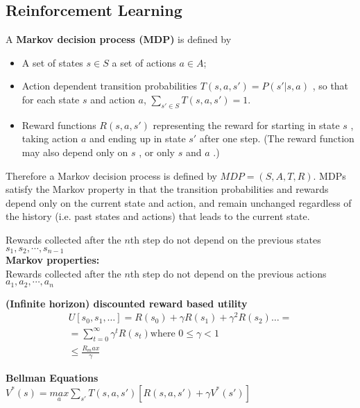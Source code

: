\subsection{Reinforcement Learning}

A \textbf{Markov decision process (MDP)} is defined by
\begin{itemize}
    \item A set of states  $s\in S$ a set of actions $a \in A$;
    
    \item Action dependent transition probabilities $T(s,a,s')=P(s'|s, a)$ , so that for each state  $s$ and action $a$,  $\displaystyle \sum _{s'\in S} T(s,a,s')=1$.
    
    \item Reward functions $R(s, a, s')$ representing the reward for starting in state  $s$ , taking action  $a$  and ending up in state  $s'$  after one step. (The reward function may also depend only on  $s$ , or only  $s$  and  $a$ .)
\end{itemize}
    
Therefore a Markov decision process is defined by $MDP = (S,A,T,R)$. MDPs satisfy the Markov property in that the transition probabilities and rewards depend only on the current state and action, and remain unchanged regardless of the history (i.e. past states and actions) that leads to the current state.

Rewards collected after the  $n$th  step do not depend on the previous states $s_1,s_2,\cdots,s_{n-1}$\\

\textbf{Markov properties:}\\

Rewards collected after the $n$th  step do not depend on the previous actions $a_1,a_2,\cdots,a_{n}$

\textbf{(Infinite horizon) discounted reward based utility}\\

\begin{align*}
U[s_0,s_1,\ldots ]= R(s_0) + \gamma R(s_1) + \gamma ^2 R(s_2) \ldots = \\
= \sum _{t=0}^\infty \gamma ^ t R(s_ t) \text {where }0\leq \gamma <1\\
\leq \frac{R_max}{\gamma}
\end{align*}

\textbf{Bellman Equations}\\

$V^{*}(s) = \underset {a}{max}\sum _{s'}T(s,a,s')[R(s,a,s')+\gamma V^{*}(s')]$\\

